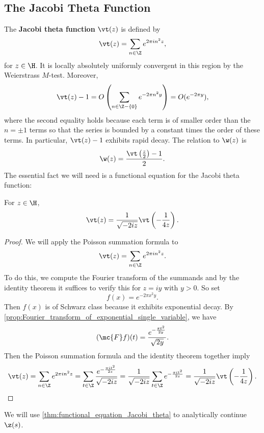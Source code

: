     \subsection*{The Jacobi Theta Function}
      The \textbf{Jacobi theta function} $\vt(z)$ is defined by
      \[
        \vt(z) = \sum_{n \in \Z}e^{2\pi in^{2}z},
      \]
      for $z \in \H$. It is locally absolutely uniformly convergent in this region by the Weierstrass $M$-test. Moreover,
      \[
        \vt(z)-1 = O\left(\sum_{n \in \Z-\{0\}}e^{-2\pi n^{2}y}\right) = O(e^{-2\pi y}),
      \]
      where the second equality holds because each term is of smaller order than the $n = \pm 1$ terms so that the series is bounded by a constant times the order of these terms. In particular, $\vt(z)-1$ exhibits rapid decay. The relation to $\w(z)$ is
      \begin{equation}\label{equ:omega_theta_relationship_for_zeta}
        \w(z) = \frac{\vt\left(\frac{z}{2}\right)-1}{2}.
      \end{equation}
      The essential fact we will need is a functional equation for the Jacobi theta function:

      \begin{theorem}\label{thm:functional_equation_Jacobi_theta}
        For $z \in \H$,
        \[
          \vt(z) = \frac{1}{\sqrt{-2iz}}\vt\left(-\frac{1}{4z}\right).
        \]
      \end{theorem}
      \begin{proof}
        We will apply the Poisson summation formula to
        \[
          \vt(z) = \sum_{n \in \Z}e^{2\pi in^{2}z}.
        \]
        To do this, we compute the Fourier transform of the summands and by the identity theorem it suffices to verify this for $z = iy$ with $y > 0$. So set
        \[
          f(x) = e^{-2\pi x^{2}y}.
        \]
        Then $f(x)$ is of Schwarz class because it exhibits exponential decay. By \cref{prop:Fourier_transform_of_exponential_single_variable}, we have
        \[
          (\mc{F}f)(t) = \frac{e^{-\frac{\pi t^{2}}{2y}}}{\sqrt{2y}}.
        \]
        Then the Poisson summation formula and the identity theorem together imply
        \[
          \vt(z) = \sum_{n \in \Z}e^{2\pi in^{2}z} = \sum_{t \in \Z}\frac{e^{-\frac{\pi it^{2}}{2z}}}{\sqrt{-2iz}} = \frac{1}{\sqrt{-2iz}}\sum_{t \in \Z}e^{-\frac{\pi it^{2}}{2z}} = \frac{1}{\sqrt{-2iz}}\vt\left(-\frac{1}{4z}\right).
        \]
      \end{proof}

      We will use \cref{thm:functional_equation_Jacobi_theta} to analytically continue $\z(s)$.
